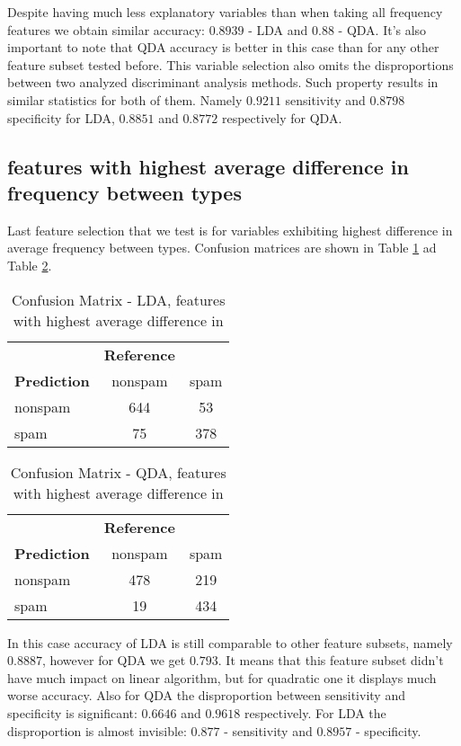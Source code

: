 \documentclass[12pt, letter paper]{article}
\begin{document}
	Despite having much less explanatory variables than when taking all frequency features we obtain similar accuracy: $0.8939$ - LDA and $0.88$ - QDA. It's also important to note that QDA accuracy is better in this case than for any other feature subset tested before. This variable selection also omits the disproportions between two analyzed discriminant analysis methods. Such property results in similar statistics for both of them. Namely $0.9211$ sensitivity and $0.8798$ specificity for LDA,  $0.8851$ and $0.8772$ respectively for QDA.
	 
	 \subsection*{features with highest average difference in frequency between types}
	 
	 Last feature selection that we test is for variables exhibiting highest difference in average frequency between types. Confusion matrices are shown in Table \ref{tab:confusion_matrix_lda5} ad Table \ref{tab:confusion_matrix_qda5}.
	 
	 \begin{table}[h]
	 	\centering
	 	\begin{tabular}{lcc}
	 		& \textbf{Reference} & \\
	 		\textbf{Prediction} & nonspam & spam \\
	 		nonspam & 644 & 53 \\
	 		spam & 75 & 378 \\
	 	\end{tabular}
	 	\caption{Confusion Matrix - LDA, features with highest average difference in}
	 	\label{tab:confusion_matrix_lda5}
	 \end{table}
	 
	 \begin{table}[h]
	 	\centering
	 	\begin{tabular}{lcc}
	 		& \textbf{Reference} & \\
	 		\textbf{Prediction} & nonspam & spam \\
	 		nonspam & 478 & 219 \\
	 		spam & 19 & 434 \\
	 	\end{tabular}
	 	\caption{Confusion Matrix - QDA, features with highest average difference in}
	 	\label{tab:confusion_matrix_qda5}
	 \end{table}
	 
	 In this case accuracy of LDA is still comparable to other feature subsets, namely $0.8887$, however for QDA we get $0.793$. It means that this feature subset didn't have much impact on linear algorithm, but for quadratic one it displays much worse accuracy. Also for QDA the disproportion between sensitivity and specificity is significant: $0.6646$ and $0.9618$ respectively. For LDA the disproportion is almost invisible: $0.877$ - sensitivity and $0.8957$ - specificity.
	 
	 
	 
\end{document}
